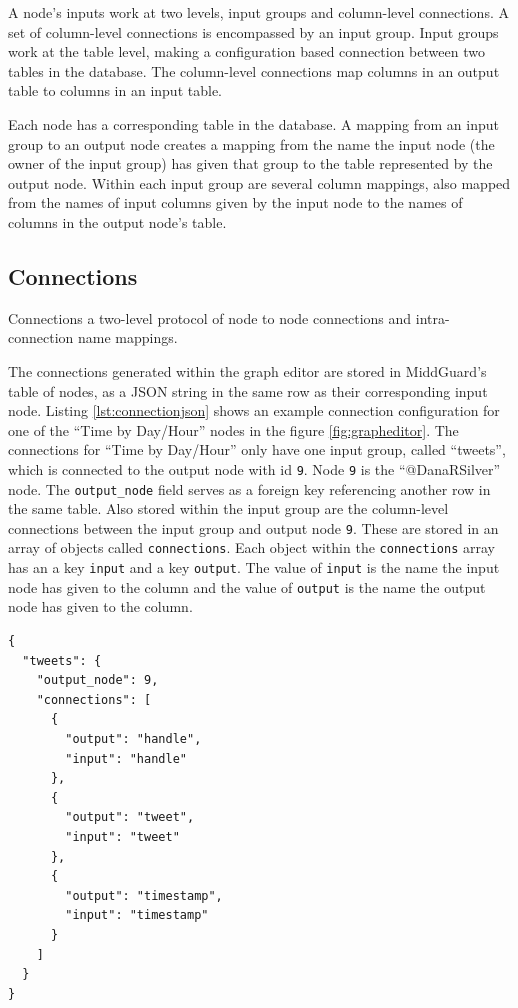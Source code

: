 \documentclass[midd]{thesis}
\begin{document}
A node's inputs work at two levels, input groups and column-level connections. A
set of column-level connections is encompassed by an input group. Input groups
work at the table level, making a configuration based connection between two
tables in the database. The column-level connections map columns in an output
table to columns in an input table.

Each node has a corresponding table in the database. A mapping from an input
group to an output node creates a mapping from the name the input node (the
owner of the input group) has given that group to the table represented by the
output node. Within each input group are several column mappings, also mapped
from the names of input columns given by the input node to the names of columns
in the output node's table.

\subsection{Connections}

Connections a two-level protocol of node to node connections and
intra-connection name mappings.

The connections generated within the graph editor are stored in MiddGuard's
table of nodes, as a JSON string in the same row as their corresponding input
node. Listing \ref{lst:connectionjson} shows an example connection configuration
for one of the ``Time by Day/Hour'' nodes in the figure \ref{fig:grapheditor}.
The connections for ``Time by Day/Hour'' only have one input group, called
``tweets'', which is connected to the output node with id \texttt{9}. Node
\texttt{9} is the ``@DanaRSilver'' node. The \texttt{output\_node} field serves
as a foreign key referencing another row in the same table. Also stored within
the input group are the column-level connections between the input group and
output node \texttt{9}. These are stored in an array of objects called
\texttt{connections}. Each object within the \texttt{connections} array has an a
key \texttt{input} and a key \texttt{output}. The value of \texttt{input} is the
name the input node has given to the column and the value of \texttt{output} is
the name the output node has given to the column.

\begin{lstlisting}[caption={A node's connection configuration. The node has a connection from its input group ``tweets'' to the node with id 9.}, captionpos=b, label={lst:connectionjson}]
{
  "tweets": {
    "output_node": 9,
    "connections": [
      {
        "output": "handle",
        "input": "handle"
      },
      {
        "output": "tweet",
        "input": "tweet"
      },
      {
        "output": "timestamp",
        "input": "timestamp"
      }
    ]
  }
}
\end{lstlisting}
\end{document}
